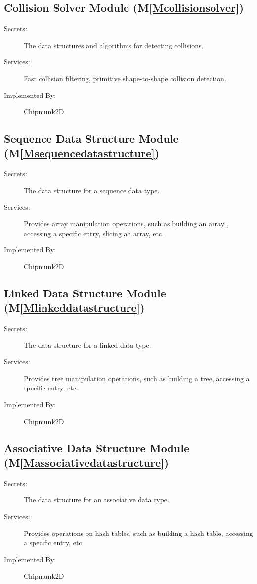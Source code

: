 \documentclass[12pt]{article}
\begin{document}
\subsection{Collision Solver Module (M\ref{Mcollisionsolver})}
\label{Sec:CSM()}
\begin{description}
\item[Secrets:]The data structures and algorithms for detecting collisions.
\item[Services:]Fast collision filtering, primitive shape-to-shape collision detection.
\item[Implemented By:]Chipmunk2D
\end{description}
\subsection{Sequence Data Structure Module (M\ref{Msequencedatastructure})}
\label{Sec:SDSM()}
\begin{description}
\item[Secrets:]The data structure for a sequence data type.
\item[Services:]Provides array manipulation operations, such as building an array , accessing a specific entry, slicing an array, etc.
\item[Implemented By:]Chipmunk2D
\end{description}
\subsection{Linked Data Structure Module (M\ref{Mlinkeddatastructure})}
\label{Sec:LDSM()}
\begin{description}
\item[Secrets:]The data structure for a linked data type.
\item[Services:]Provides tree manipulation operations, such as building a tree, accessing a specific entry, etc.
\item[Implemented By:]Chipmunk2D
\end{description}
\subsection{Associative Data Structure Module (M\ref{Massociativedatastructure})}
\label{Sec:ADSM()}
\begin{description}
\item[Secrets:]The data structure for an associative data type.
\item[Services:]Provides operations on hash tables, such as building a hash table, accessing a specific entry, etc.
\item[Implemented By:]Chipmunk2D
\end{description}
\end{document}
